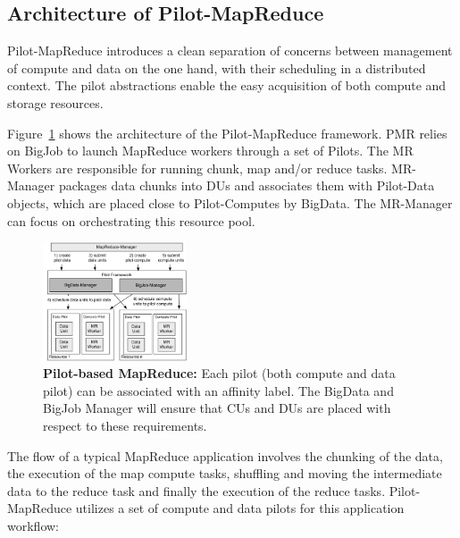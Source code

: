 \documentclass{acm_proc_article-sp}
\newcommand{\alnote}[1]{ {\textcolor{blue} { ***andreL: #1 }}}
\newcommand{\alnote}[1]{}
\newcommand{\upp}{\vspace*{-0.5em}}
\newcommand{\pilots}{Pilots\xspace}
\newcommand{\pilotcomputes}{Pilot-Computes\xspace}
\newcommand{\pilotmapreduce}{Pilot-MapReduce\xspace}
\newcommand{\mrmg}{MR-Manager\xspace}
\newcommand{\dus}{DUs\xspace}
\newcommand{\pilotdata}{Pilot-Data\xspace}
\begin{document}


\upp
\subsection{Architecture of \pilotmapreduce}
\pilotmapreduce introduces a clean separation of concerns between
management of compute and data on the one hand, with their scheduling
in a distributed context. The pilot abstractions enable the easy
acquisition of both compute and storage resources. 
 
Figure~\ref{fig:figures_mapreduce-pilotdata} shows the architecture of
the \pilotmapreduce framework. PMR relies on BigJob to launch
MapReduce workers through a set of \pilots. The MR Workers are
responsible for running chunk, map and/or reduce tasks. \mrmg packages
data chunks into \dus and associates them with \pilotdata objects,
which are placed close to \pilotcomputes by BigData.  The \mrmg can
focus on orchestrating this resource pool.



\begin{figure}[t]
	\centering
	\includegraphics[width=0.38\textwidth]{figures/mapreduce-pilotdata.pdf}
	\caption{\textbf{Pilot-based MapReduce:} Each pilot (both compute and data 
	pilot) can be associated with an affinity label. The BigData and BigJob 
	Manager will ensure that CUs and DUs are placed with respect to these 
	requirements.\upp}
	\label{fig:figures_mapreduce-pilotdata}
\end{figure}

The flow of a typical MapReduce application involves the chunking of
the data, the execution of the map compute tasks, shuffling and moving
the intermediate data to the reduce task and finally the execution of
the reduce tasks.  \pilotmapreduce utilizes a set of compute and data
pilots for this application workflow:
\end{document}
